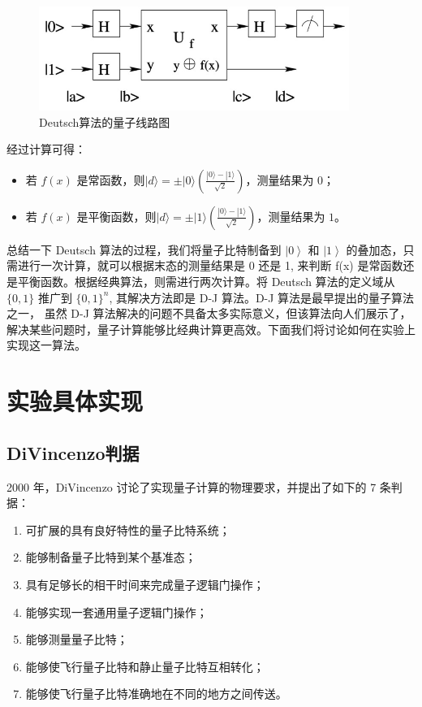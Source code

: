 \documentclass[a4paper,UTF8]{ctexart}
\begin{document}
\begin{figure}[H]
    \centering
    \begin{minipage}[b]{0.9\textwidth}
        \centering
        \includegraphics[width=0.9\textwidth]{./fig3.jpg}
        \caption{Deutsch算法的量子线路图}
    \end{minipage}
\end{figure}

经过计算可得：

\begin{itemize}
    \item 若 $f(x)$ 是常函数，则$|d\rangle=\pm|0\rangle(\frac{|0\rangle-|1\rangle}{\sqrt{2}})$，测量结果为 $0$；
    \item 若 $f(x)$ 是平衡函数，则$|d\rangle=\pm|1\rangle(\frac{|0\rangle-|1\rangle}{\sqrt{2}})$，测量结果为 $1$。
\end{itemize}

总结一下 Deutsch 算法的过程，我们将量子比特制备到 $\left|0\right>$ 和 $\left|1\right>$ 的叠加态，只需进行一次计算，就可以根据末态的测量结果是 0 还是 1, 来判断 f(x) 是常函数还是平衡函数。根据经典算法，则需进行两次计算。将 Deutsch 算法的定义域从 $\{0,1\}$ 推广到 $\{0,1\}^n$, 其解决方法即是 D-J 算法。D-J 算法是最早提出的量子算法之一， 虽然 D-J 算法解决的问题不具备太多实际意义，但该算法向人们展示了，解决某些问题时，量子计算能够比经典计算更高效。下面我们将讨论如何在实验上实现这一算法。

\section{实验具体实现}

\subsection{DiVincenzo判据}

2000 年，DiVincenzo 讨论了实现量子计算的物理要求，并提出了如下的 7 条判
据：

\begin{enumerate}
    \item 可扩展的具有良好特性的量子比特系统；
    \item 能够制备量子比特到某个基准态；
    \item 具有足够长的相干时间来完成量子逻辑门操作；
    \item 能够实现一套通用量子逻辑门操作；
    \item 能够测量量子比特；
    \item 能够使飞行量子比特和静止量子比特互相转化；
    \item 能够使飞行量子比特准确地在不同的地方之间传送。
\end{enumerate}
\end{document}
